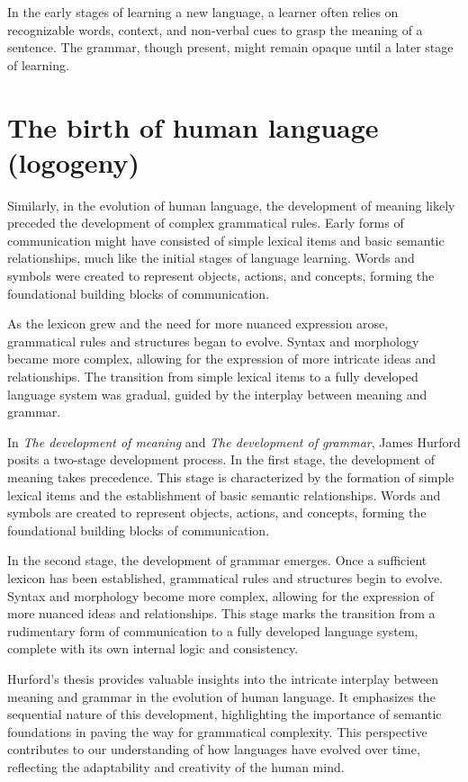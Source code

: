     In the early stages of learning a new language, a learner often relies on recognizable words, context, and non-verbal cues to grasp the meaning of a sentence. The grammar, though present, might remain opaque until a later stage of learning.

\section{The birth of human language (logogeny)}

Similarly, in the evolution of human language, the development of meaning likely preceded the development of complex grammatical rules. Early forms of communication might have consisted of simple lexical items and basic semantic relationships, much like the initial stages of language learning. Words and symbols were created to represent objects, actions, and concepts, forming the foundational building blocks of communication.

As the lexicon grew and the need for more nuanced expression arose, grammatical rules and structures began to evolve. Syntax and morphology became more complex, allowing for the expression of more intricate ideas and relationships. The transition from simple lexical items to a fully developed language system was gradual, guided by the interplay between meaning and grammar.

In \textit{The development of meaning} and \textit{The development of grammar}, James Hurford posits a two-stage development process. In the first stage, the development of meaning takes precedence. This stage is characterized by the formation of simple lexical items and the establishment of basic semantic relationships. Words and symbols are created to represent objects, actions, and concepts, forming the foundational building blocks of communication.

In the second stage, the development of grammar emerges. Once a sufficient lexicon has been established, grammatical rules and structures begin to evolve. Syntax and morphology become more complex, allowing for the expression of more nuanced ideas and relationships. This stage marks the transition from a rudimentary form of communication to a fully developed language system, complete with its own internal logic and consistency.

Hurford's thesis provides valuable insights into the intricate interplay between meaning and grammar in the evolution of human language. It emphasizes the sequential nature of this development, highlighting the importance of semantic foundations in paving the way for grammatical complexity. This perspective contributes to our understanding of how languages have evolved over time, reflecting the adaptability and creativity of the human mind.


